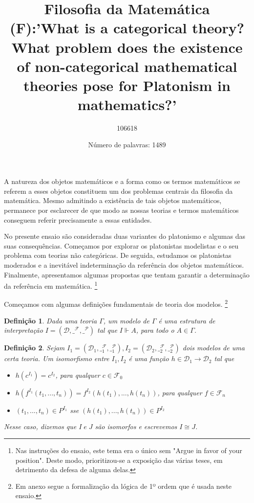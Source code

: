\documentclass{article}
\title{Filosofia da Matemática 
\\(F):'What is a categorical theory? What problem does the existence of non-categorical mathematical theories pose for Platonism in mathematics?'}
\author{106618 }
\date{Número de palavras: 1489}
\begin{document}
\newtheorem{dfn}{Definição}
\renewcommand{\refname}{Bibliografia}

\maketitle
A natureza dos objetos matemáticos e a forma como os termos matemáticos se referem a esses objetos constituem um dos problemas centrais da filosofia da matemática. Mesmo admitindo a existência de tais objetos matemáticos, permanece por esclarecer de que modo as nossas teorias e termos matemáticos conseguem referir precisamente a essas entidades.


No presente ensaio são consideradas duas variantes do platonismo e algumas das suas consequências. Começamos por explorar os platonistas modelistas e o seu problema com teorias não categóricas. De seguida, estudamos os platonistas moderados e a inevitável indeterminação da referência dos objetos matemáticos. Finalmente, apresentamos algumas propostas que tentam garantir a determinação da referência em matemática. \footnote{Nas instruções do ensaio, este tema era o único sem "Argue in favor of your position". Deste modo, prioritizou-se a exposição das várias teses, em detrimento da defesa de alguma delas.}

\vspace{1cm}

Começamos com algumas definições fundamentais de teoria dos modelos. \footnote{Em anexo segue a formalização da lógica de 1º ordem que é usada neste ensaio.}

\vspace{0.5cm}

\begin{dfn}
    Dada uma teoria $\Gamma$, um modelo de $\Gamma$ é uma estrutura de interpretação $I=(\mathcal{D}, \_^{\mathcal{F}}, \_^{\mathcal{P}})$ tal que $I \Vdash A$, para todo o $A \in \Gamma$.
\end{dfn}

\vspace{0.5cm}

\begin{dfn}
    Sejam $I_1=(\mathcal{D}_1,\_^{\mathcal{F}}_1,\_^{\mathcal{P}}_1), I_2=(\mathcal{D}_2,\_^{\mathcal{F}}_2,\_^{\mathcal{P}}_2)$ dois modelos de uma certa teoria. Um isomorfismo entre $I_1, I_2$ é uma função $h \in \mathcal{D}_1 \rightarrow\mathcal{D}_2$ tal que
    \begin{itemize}
        \item $h(c^{I{_1}})=c^{I_{2}}$, para qualquer $c \in \mathcal{F}_0$
        \item $h(f^{I_1}(t_1,...,t_n))=f^{I_2}(h(t_1),...,h(t_n))$, para qualquer $f \in \mathcal{F}_n$
        \item $(t_1,...,t_n) \in P^{I_1}$ sse $(h(t_1),...,h(t_n)) \in P^{I_2}$
    \end{itemize}
    Nesse caso, dizemos que $I\;e\;J$ são isomorfos e escrevemos $I \cong J$.
\end{dfn}
\end{document}
